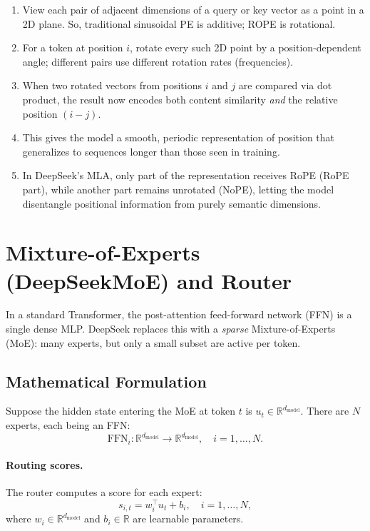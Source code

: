 \documentclass[11pt]{article}
\theoremstyle{remark}
\newcommand{\highlight}[1]{\colorbox{yellow!40}{#1}}
\begin{document}
\begin{enumerate}[label=\arabic*)]
  \item View each pair of adjacent dimensions of a query or key vector as a point in a 2D plane. So, \highlight{traditional sinusoidal PE is additive; ROPE is rotational}. 
  \item For a token at position $i$, rotate every such 2D point by a position-dependent angle; different pairs use different rotation rates (frequencies).
  \item When two rotated vectors from positions $i$ and $j$ are compared via dot product, the result now encodes both content similarity \emph{and} the relative position $(i-j)$.
  \item This gives the model a smooth, periodic representation of position that generalizes to sequences longer than those seen in training.
  \item In DeepSeek's MLA, only part of the representation receives RoPE (RoPE part), while another part remains unrotated (NoPE), letting the model disentangle positional information from purely semantic dimensions.
\end{enumerate}

\section{Mixture-of-Experts (DeepSeekMoE) and Router}

In a standard Transformer, the post-attention feed-forward network (FFN) is a single dense MLP. DeepSeek replaces this with a \emph{sparse} Mixture-of-Experts (MoE): many experts, but only a small subset are active per token.

\subsection{Mathematical Formulation}

Suppose the hidden state entering the MoE at token $t$ is $u_t \in \mathbb{R}^{d_{\text{model}}}$. There are $N$ experts, each being an FFN:
\[
\text{FFN}_i: \mathbb{R}^{d_{\text{model}}} \to \mathbb{R}^{d_{\text{model}}}, \quad i = 1,\dots,N.
\]

\paragraph{Routing scores.}
The router computes a score for each expert:
\[
s_{i,t} = w_i^\top u_t + b_i, \quad i = 1,\dots,N,
\]
where \highlight{$w_i \in \mathbb{R}^{d_{\text{model}}}$} and $b_i \in \mathbb{R}$ are learnable parameters.
\end{document}

